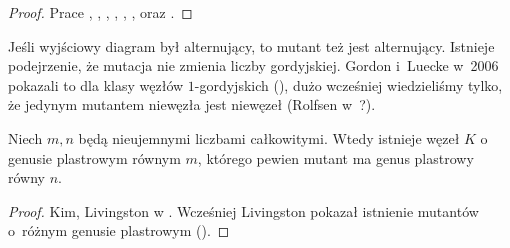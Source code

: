 \begin{proof}
    Prace \cite{menasco91}, \cite{przytycki89}, \cite{lipson87}, \cite{cooper99}, \cite{ruberman87}, \cite{ruberman99}, \cite{rong94} oraz \cite{kirk89}.
\end{proof}

Jeśli wyjściowy diagram był alternujący, to mutant też jest alternujący.
Istnieje podejrzenie, że mutacja nie zmienia liczby gordyjskiej.
Gordon i~Luecke w~2006 pokazali to dla klasy węzłów $1$-gordyjskich (\cite{gordon06}), dużo wcześniej wiedzieliśmy tylko, że jedynym mutantem niewęzła jest niewęzeł (Rolfsen w~\cite{rolfsen93}?).

\begin{proposition}
    Niech $m, n$ będą nieujemnymi liczbami całkowitymi.
    Wtedy istnieje węzeł $K$ o genusie plastrowym równym $m$, którego pewien mutant ma genus plastrowy równy $n$.
\end{proposition}

\begin{proof}
    Kim, Livingston w \cite{kim05}.
    Wcześniej Livingston pokazał istnienie mutantów o~różnym genusie plastrowym (\cite{livingston83}).
\end{proof}
